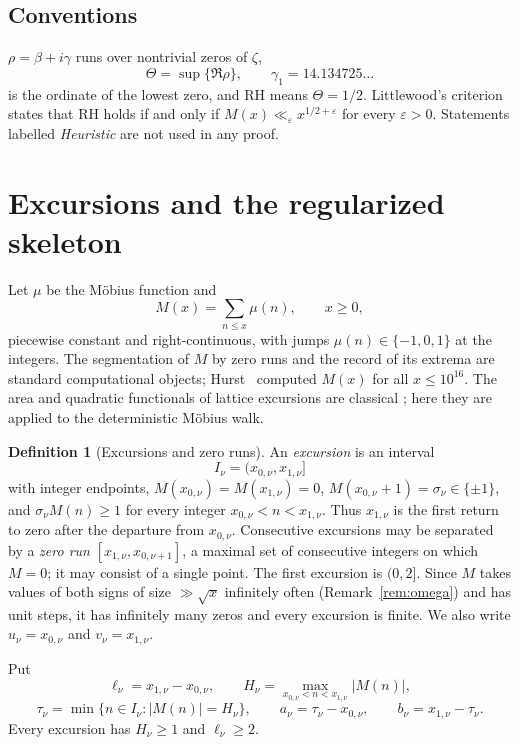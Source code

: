 \documentclass[11pt]{amsart}
\numberwithin{equation}{section}
\theoremstyle{plain}
\theoremstyle{definition}
\newtheorem{definition}[theorem]{Definition}
\theoremstyle{remark}
\newcommand{\eps}{\varepsilon}
\begin{document}
\subsection*{Conventions}
$\rho=\beta+i\gamma$ runs over nontrivial zeros of $\zeta$,
\[
\Theta=\sup\{\Re\rho\},\qquad \gamma_1=14.134725\ldots
\]
is the ordinate of the lowest zero, and RH means $\Theta=1/2$. Littlewood's
criterion \cite[\S14.25]{Titchmarsh1986} states that RH holds if and only if
$M(x)\ll_\eps x^{1/2+\eps}$ for every $\eps>0$. Statements labelled
\emph{Heuristic} are not used in any proof.

\section{Excursions and the regularized skeleton}
\label{sec:definitions}

Let $\mu$ be the M\"obius function and
\begin{equation}
\label{eq:mertens_def}
M(x)=\sum_{n\le x}\mu(n),\qquad x\ge0,
\end{equation}
piecewise constant and right-continuous, with jumps $\mu(n)\in\{-1,0,1\}$
at the integers. The segmentation of $M$ by zero runs and the record of its
extrema are standard computational objects; Hurst~\cite{Hurst18} computed
$M(x)$ for all $x\le10^{16}$. The area and quadratic functionals of lattice
excursions are classical
\cite{Takacs91,NguyenThe04,Richard05,Janson07,DKW15,CP17}; here they are
applied to the deterministic M\"obius walk.

\begin{definition}[Excursions and zero runs]
\label{def:excursion}
An \emph{excursion} is an interval
\[
I_\nu=(x_{0,\nu},x_{1,\nu}]
\]
with integer endpoints, $M(x_{0,\nu})=M(x_{1,\nu})=0$,
$M(x_{0,\nu}+1)=\sigma_\nu\in\{\pm1\}$, and
$\sigma_\nu M(n)\ge1$ for every integer $x_{0,\nu}<n<x_{1,\nu}$. Thus
$x_{1,\nu}$ is the first return to zero after the departure from
$x_{0,\nu}$. Consecutive excursions may be separated by a \emph{zero run}
$[x_{1,\nu},x_{0,\nu+1}]$, a maximal set of consecutive integers on which
$M=0$; it may consist of a single point. The first excursion is $(0,2]$.
Since $M$ takes values of both signs of size $\gg\sqrt x$ infinitely often
(Remark~\ref{rem:omega}) and has unit steps, it has infinitely many zeros
and every excursion is finite. We also write $u_\nu=x_{0,\nu}$ and
$v_\nu=x_{1,\nu}$.

Put
\[
\ell_\nu=x_{1,\nu}-x_{0,\nu},\qquad
H_\nu=\max_{x_{0,\nu}<n<x_{1,\nu}}|M(n)|,
\]
\[
\tau_\nu=\min\{n\in I_\nu:|M(n)|=H_\nu\},\qquad
a_\nu=\tau_\nu-x_{0,\nu},\qquad b_\nu=x_{1,\nu}-\tau_\nu.
\]
Every excursion has $H_\nu\ge1$ and $\ell_\nu\ge2$.
\end{definition}
\end{document}

